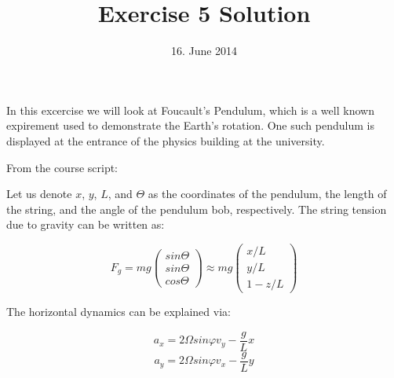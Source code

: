\documentclass[a4paper,12pt]{article}
\title{Exercise 5 Solution}
\date{16. June 2014}
\begin{document}
\maketitle
\thispagestyle{fancy}

In this excercise we will look at Foucault's Pendulum, which is a well known expirement
used to demonstrate the Earth's rotation. One such pendulum is
displayed at the entrance of the physics building at the university.

From the course script:

Let us denote $x$, $y$, $L$, and $\Theta$ as the coordinates of the
pendulum, the length of the string, and the angle of the pendulum bob,
respectively. The string tension due to gravity can be written as:

\begin{equation}
F_{g} = mg \left (\begin{array}{c} sin{\Theta} \\ sin{\Theta} \\
    cos{\Theta} \end{array} \right ) \approx mg \left (\begin{array}{c} x/L \\ y/L \\
    1-z/L \end{array} \right )
\end{equation} 

The horizontal dynamics can be explained via:

\begin{equation}
a_x = 2\Omega sin \varphi v_y - \frac{g}{L}x 
\end{equation}
\begin{equation}
a_y = 2\Omega sin \varphi v_x - \frac{g}{L}y
\end{equation}
\end{document}
